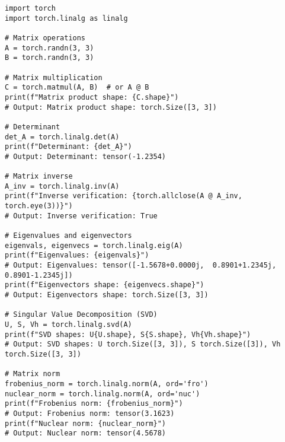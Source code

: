 \documentclass[11pt,a4paper]{book}
\begin{document}
\begin{verbatim}
import torch
import torch.linalg as linalg

# Matrix operations
A = torch.randn(3, 3)
B = torch.randn(3, 3)

# Matrix multiplication
C = torch.matmul(A, B)  # or A @ B
print(f"Matrix product shape: {C.shape}")
# Output: Matrix product shape: torch.Size([3, 3])

# Determinant
det_A = torch.linalg.det(A)
print(f"Determinant: {det_A}")
# Output: Determinant: tensor(-1.2354)

# Matrix inverse
A_inv = torch.linalg.inv(A)
print(f"Inverse verification: {torch.allclose(A @ A_inv, torch.eye(3))}")
# Output: Inverse verification: True

# Eigenvalues and eigenvectors
eigenvals, eigenvecs = torch.linalg.eig(A)
print(f"Eigenvalues: {eigenvals}")
# Output: Eigenvalues: tensor([-1.5678+0.0000j,  0.8901+1.2345j,  0.8901-1.2345j])
print(f"Eigenvectors shape: {eigenvecs.shape}")
# Output: Eigenvectors shape: torch.Size([3, 3])

# Singular Value Decomposition (SVD)
U, S, Vh = torch.linalg.svd(A)
print(f"SVD shapes: U{U.shape}, S{S.shape}, Vh{Vh.shape}")
# Output: SVD shapes: U torch.Size([3, 3]), S torch.Size([3]), Vh torch.Size([3, 3])

# Matrix norm
frobenius_norm = torch.linalg.norm(A, ord='fro')
nuclear_norm = torch.linalg.norm(A, ord='nuc')
print(f"Frobenius norm: {frobenius_norm}")
# Output: Frobenius norm: tensor(3.1623)
print(f"Nuclear norm: {nuclear_norm}")
# Output: Nuclear norm: tensor(4.5678)
\end{verbatim}
\end{document}
